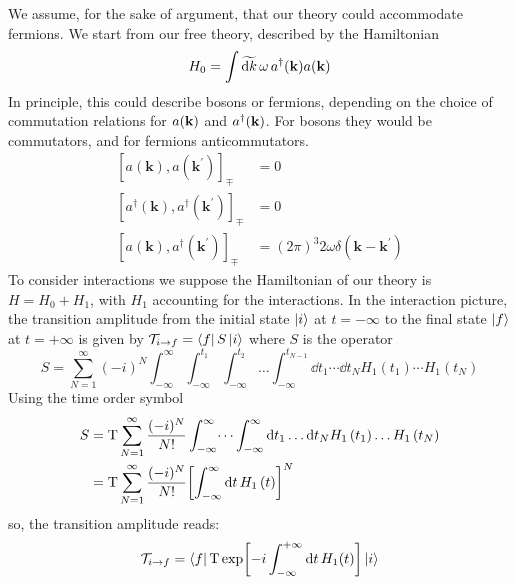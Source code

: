 We assume, for the sake of argument, that our theory could accommodate fermions. We start from our free theory, described by the Hamiltonian
\begin{equation}
    H_0=\int\widetilde{{\dd k}}\, \omega\,a^\dagger(\vb{k})a(\vb{k})
\end{equation}
In principle, this could describe bosons or fermions, depending on the choice of commutation relations for $a(\vb{k})$ and $a^\dagger(\vb{k})$. For bosons they would be commutators, and for fermions anticommutators.
\begin{equation}
\begin{aligned}
\left[a(\mathbf{k}), a\left(\mathbf{k}^{\prime}\right)\right]_{\mp} &=0 \\
\left[a^{\dagger}(\mathbf{k}), a^{\dagger}\left(\mathbf{k}^{\prime}\right)\right]_{\mp} &=0 \\
\left[a(\mathbf{k}), a^{\dagger}\left(\mathbf{k}^{\prime}\right)\right]_{\mp} &=(2 \pi)^{3} 2 \omega \delta\left(\mathbf{k}-\mathbf{k}^{\prime}\right)
\end{aligned}
\end{equation}
To consider interactions we suppose the Hamiltonian of our theory is $H=H_0+H_1$, with $H_1$ accounting for the interactions. In the interaction picture, the transition amplitude from the initial state $\ket{i}$ at $t=-\infty$ to the final state $\ket{f}$ at $t=+\infty$ is given by $\mathcal{T}_{i\to f}=\bra{f}S\ket{i}$ where $S$ is the operator
\begin{equation}
S=\sum_{N=1}^{\infty}(-i)^{N} \int_{-\infty}^{\infty} \int_{-\infty}^{t_{1}} \int_{-\infty}^{t_{2}} \dots \int_{-\infty}^{t_{N-1}} \dd t_{1} \cdots \dd t_{N} H_1\left(t_{1}\right) \cdots H_1\left(t_{N}\right) 
\end{equation}
Using the time order symbol
\begin{equation}
\begin{aligned}
S&=\text{T}\sum_{N=1}^{\infty} \frac{(-i)^{N}}{N !} \int_{-\infty}^{\infty} \dots \int_{-\infty}^{\infty} \dd t_{1} \dots \dd t_{N} H_1\left(t_{1}\right) \dots H_1\left(t_{N}\right)\\
&=\text{T}\sum_{N=1}^{\infty} \frac{(-i)^{N}}{N !} \qty[\int_{-\infty}^{\infty}  \dd t\, H_1\left(t\right)]^N
\end{aligned}
\end{equation}
so, the transition amplitude reads:
\begin{equation}
\mathcal{T}_{i\to f}= \bra{f}\text{T}\exp[-i\int_{-\infty}^{+\infty}\dd t \,H_1(t)]\ket{i}
\label{amplitude_interactions}
\end{equation}
